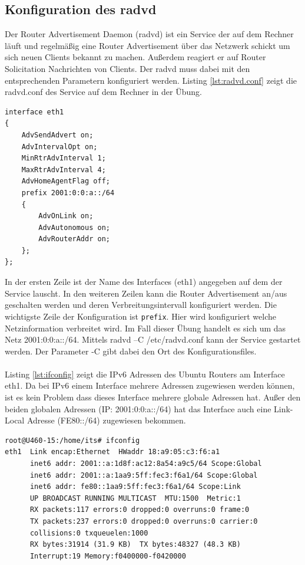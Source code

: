 \documentclass[a4paper,12pt]{article} %
\begin{document}
\subsection{Konfiguration des radvd}
Der Router Advertisement Daemon (radvd) ist ein Service der auf dem Rechner läuft und regelmäßig eine Router Advertisement über das Netzwerk schickt um sich neuen Clients bekannt zu machen. Außerdem reagiert er auf Router Solicitation Nachrichten von Clients. Der radvd muss dabei mit den entsprechenden Parametern konfiguriert werden. Listing \ref{lst:radvd.conf} zeigt die radvd.conf des Service auf dem Rechner in der Übung.

\begin{lstlisting}[style=code,caption={radvd.conf},label=lst:radvd.conf]
interface eth1
{
	AdvSendAdvert on;
	AdvIntervalOpt on;
	MinRtrAdvInterval 1;
	MaxRtrAdvInterval 4;
	AdvHomeAgentFlag off;
	prefix 2001:0:0:a::/64
	{
		AdvOnLink on;
		AdvAutonomous on;
		AdvRouterAddr on;
	};
};
\end{lstlisting}

In der ersten Zeile ist der Name des Interfaces (eth1) angegeben auf dem der Service lauscht. In den weiteren Zeilen kann die Router Advertisement an/aus geschalten werden und deren Verbreitungsintervall konfiguriert werden. Die wichtigste Zeile der Konfiguration ist \verb!prefix!. Hier wird konfiguriert welche Netzinformation verbreitet wird. Im Fall dieser Übung handelt es sich um das Netz 2001:0:0:a::/64.
Mittels radvd –C /etc/radvd.conf kann der Service gestartet werden. Der Parameter -C gibt dabei den Ort des Konfigurationsfiles.

\paragraph{}
Listing \ref{lst:ifconfig} zeigt die IPv6 Adressen des Ubuntu Routers am Interface eth1. Da bei IPv6 einem Interface mehrere Adressen zugewiesen werden können, ist es kein Problem dass dieses Interface mehrere globale Adressen hat. Außer den beiden globalen Adressen (IP: 2001:0:0:a::/64) hat das Interface auch eine Link-Local Adresse (FE80::/64) zugewiesen bekommen.

\begin{lstlisting}[style=code,caption={ifconfig des Ubuntu Routers},label=lst:ifconfig]
root@U460-15:/home/its# ifconfig
eth1  Link encap:Ethernet  HWaddr 18:a9:05:c3:f6:a1  
      inet6 addr: 2001::a:1d8f:ac12:8a54:a9c5/64 Scope:Global
      inet6 addr: 2001::a:1aa9:5ff:fec3:f6a1/64 Scope:Global
      inet6 addr: fe80::1aa9:5ff:fec3:f6a1/64 Scope:Link
      UP BROADCAST RUNNING MULTICAST  MTU:1500  Metric:1
      RX packets:117 errors:0 dropped:0 overruns:0 frame:0
      TX packets:237 errors:0 dropped:0 overruns:0 carrier:0
      collisions:0 txqueuelen:1000 
      RX bytes:31914 (31.9 KB)  TX bytes:48327 (48.3 KB)
      Interrupt:19 Memory:f0400000-f0420000
\end{lstlisting}
\end{document}
